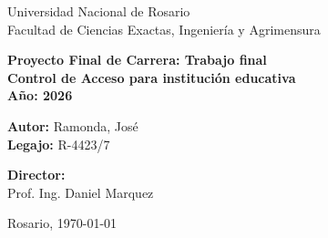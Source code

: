 \begin{titlepage}
	\begin{center}
		\doublespacing
		\Large
		Universidad Nacional de Rosario \\
		Facultad de Ciencias Exactas, Ingeniería y Agrimensura
		
		\vspace{1cm}
		
		\textbf{\huge Proyecto Final de Carrera: \newline Trabajo final} \\[0.5cm]
		\textbf{\LARGE Control de Acceso para institución educativa} \\[0.5cm]
		\textbf{Año: 2026}
		
		\vfill
		
		\large
		\textbf{Autor:} Ramonda, José \\
		\textbf{Legajo:} R-4423/7
		
		\vspace{1.5cm}
		
		\large
		\textbf{Director:} \\
		
		
		 Prof. Ing. Daniel Marquez 
		 
		
		\vfill
		
		\large
		Rosario, \today
		
	\end{center}
\end{titlepage}
